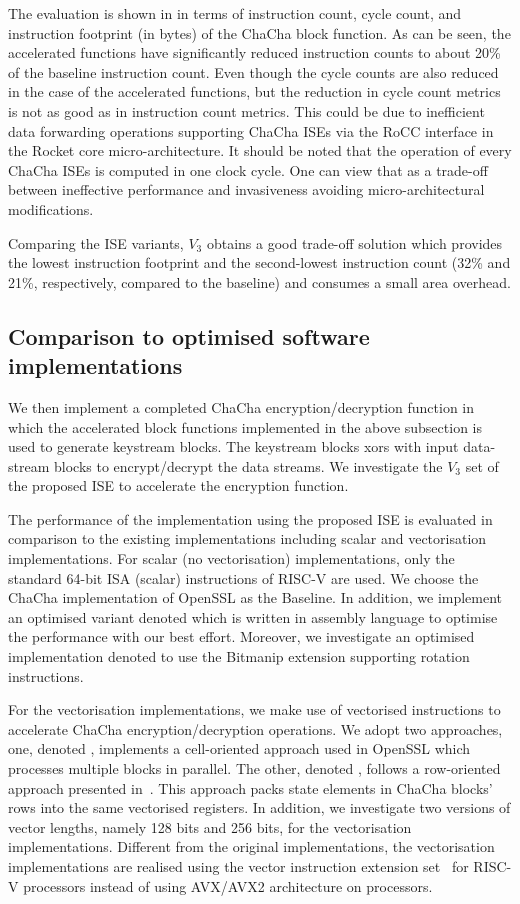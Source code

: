 The evaluation is shown in  in terms of instruction count, cycle count, and instruction footprint (in bytes) of the ChaCha block function. As can be seen, the accelerated functions have significantly reduced instruction counts to about 20\% of the baseline instruction count. Even though the cycle counts are also reduced in the case of the accelerated functions, but the reduction in cycle count metrics is not as good as in instruction count metrics. This could be due to inefficient data forwarding operations supporting ChaCha ISEs via the RoCC interface in the Rocket core micro-architecture. It should be noted that the operation of every ChaCha ISEs is computed in one clock cycle. One can view that as a trade-off between ineffective performance and invasiveness avoiding micro-architectural modifications.

Comparing the ISE variants, $V_3$ obtains a good trade-off solution which provides the lowest instruction footprint and the second-lowest instruction count (32\% and 21\%, respectively, compared to the baseline) and consumes a small area overhead.

\subsection{Comparison to optimised software implementations}
We then implement a completed ChaCha encryption/decryption function in which the accelerated block functions implemented in the above subsection is used to generate keystream blocks. The keystream blocks xors with input data-stream blocks to encrypt/decrypt the data streams. We investigate the $V_3$ set of the proposed ISE to accelerate the encryption function. 

The performance of the implementation using the proposed ISE is evaluated in comparison to the existing implementations including scalar and vectorisation implementations.  
For scalar (no vectorisation) implementations, only the standard 64-bit ISA (scalar) instructions of RISC-V are used. We choose the ChaCha implementation of OpenSSL as the Baseline. In addition, we implement an optimised variant denoted  which is written in assembly language to optimise the performance with our best effort. Moreover, we investigate an optimised implementation denoted  to use the Bitmanip extension supporting rotation instructions.

For the vectorisation implementations, we make use of vectorised instructions to accelerate ChaCha encryption/decryption operations. 
We adopt two approaches, one, denoted , implements a cell-oriented approach used in OpenSSL which processes multiple blocks in parallel.
The other, denoted , follows a row-oriented approach presented in~\cite{GolGue:14}. This approach packs state elements in ChaCha blocks' rows into the same vectorised registers.
In addition, we investigate two versions of vector lengths, namely 128 bits and 256 bits, for the vectorisation implementations. 
Different from the original implementations, the vectorisation implementations are realised using the vector instruction extension set~\cite{riscv:ext:vector:draft} for RISC-V processors instead of using AVX/AVX2 architecture on  processors.

